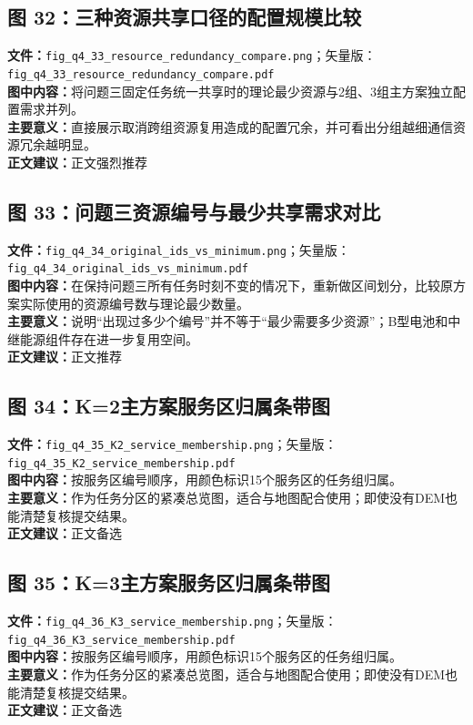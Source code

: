 \subsection*{图 32：三种资源共享口径的配置规模比较}
\textbf{文件：}\texttt{fig\_q4\_33\_resource\_redundancy\_compare.png}；矢量版：\texttt{fig\_q4\_33\_resource\_redundancy\_compare.pdf}\\
\textbf{图中内容：}将问题三固定任务统一共享时的理论最少资源与2组、3组主方案独立配置需求并列。\\
\textbf{主要意义：}直接展示取消跨组资源复用造成的配置冗余，并可看出分组越细通信资源冗余越明显。\\
\textbf{正文建议：}正文强烈推荐

\subsection*{图 33：问题三资源编号与最少共享需求对比}
\textbf{文件：}\texttt{fig\_q4\_34\_original\_ids\_vs\_minimum.png}；矢量版：\texttt{fig\_q4\_34\_original\_ids\_vs\_minimum.pdf}\\
\textbf{图中内容：}在保持问题三所有任务时刻不变的情况下，重新做区间划分，比较原方案实际使用的资源编号数与理论最少数量。\\
\textbf{主要意义：}说明“出现过多少个编号”并不等于“最少需要多少资源”；B型电池和中继能源组件存在进一步复用空间。\\
\textbf{正文建议：}正文推荐

\subsection*{图 34：K=2主方案服务区归属条带图}
\textbf{文件：}\texttt{fig\_q4\_35\_K2\_service\_membership.png}；矢量版：\texttt{fig\_q4\_35\_K2\_service\_membership.pdf}\\
\textbf{图中内容：}按服务区编号顺序，用颜色标识15个服务区的任务组归属。\\
\textbf{主要意义：}作为任务分区的紧凑总览图，适合与地图配合使用；即使没有DEM也能清楚复核提交结果。\\
\textbf{正文建议：}正文备选

\subsection*{图 35：K=3主方案服务区归属条带图}
\textbf{文件：}\texttt{fig\_q4\_36\_K3\_service\_membership.png}；矢量版：\texttt{fig\_q4\_36\_K3\_service\_membership.pdf}\\
\textbf{图中内容：}按服务区编号顺序，用颜色标识15个服务区的任务组归属。\\
\textbf{主要意义：}作为任务分区的紧凑总览图，适合与地图配合使用；即使没有DEM也能清楚复核提交结果。\\
\textbf{正文建议：}正文备选

